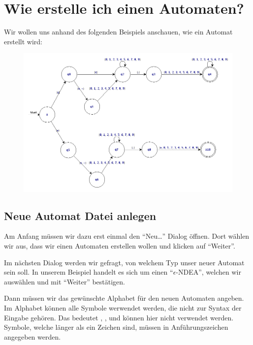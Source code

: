 

\chapter{Wie erstelle ich einen Automaten?}

Wir wollen uns anhand des folgenden Beispiels anschauen, wie ein Automat
erstellt wird:\vspace{10pt}

\begin{figure}[h]
\begin{center}
\includegraphics[width=12cm]{../images/enfa_example.png}
\end{center}
\end{figure}

\section{Neue Automat Datei anlegen}

Am Anfang müssen wir dazu erst einmal den "`Neu\ldots"' Dialog öffnen. Dort
wählen wir aus, dass wir einen Automaten erstellen wollen und klicken
auf "`Weiter"'.\vspace{10pt}

Im nächsten Dialog werden wir gefragt, von welchem Typ unser neuer
Automat sein soll. In unserem Beispiel handelt es sich um einen
"`$\epsilon$-NDEA"', welchen wir auswählen und mit "`Weiter"'
bestätigen.\vspace{10pt}

Dann müssen wir das gewünschte Alphabet für den neuen Automaten
angeben. Im Alphabet können alle Symbole werwendet werden, die nicht zur Syntax
der Eingabe gehören. Das bedeutet \Symbol{,}, \Symbol{\{}, \Symbol{\}} und
\SymbolEmpty{} können hier nicht verwendet werden. Symbole, welche länger als ein
Zeichen sind, müssen in Anführungszeichen angegeben werden.\vspace{10pt}

